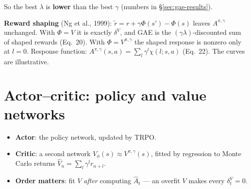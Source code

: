 \begin{keybox}
So the best $\lambda$ is \textbf{lower} than the best $\gamma$ (numbers in \S\ref{sec:gae-results}).
\end{keybox}

\begin{notebox}
\textbf{Reward shaping} (Ng et al., 1999): $\tilde r=r+\gamma\Phi(s')-\Phi(s)$ leaves $A^{\pi,\gamma}$ unchanged. With $\Phi=V$ it is exactly $\delta^V$, and GAE is the $(\gamma\lambda)$-discounted sum of shaped rewards (Eq.~20). With $\Phi=V^{\pi,\gamma}$ the shaped response is nonzero only at $l=0$. Response function: $A^{\pi,\gamma}(s,a)=\sum_l\gamma^l\chi(l;s,a)$ (Eq.~22). The curves are illustrative.
\end{notebox}

\section{Actor--critic: policy and value networks}

\begin{minipage}[c]{0.5\linewidth}
\centering
{}
\end{minipage}\hfill
\begin{minipage}[c]{0.47\linewidth}
\begin{itemize}
  \item \textbf{Actor}: the policy network, updated by TRPO.
  \item \textbf{Critic}: a second network $V_\phi(s)\approx V^{\pi,\gamma}(s)$, fitted by regression to Monte Carlo returns $\hat V_n=\sum_l\gamma^lr_{n+l}$.
  \item \textbf{Order matters}: fit $V$ \emph{after} computing $\hat A_t$ --- an overfit $V$ makes every $\delta_t^V=0$.
\end{itemize}
\end{minipage}

